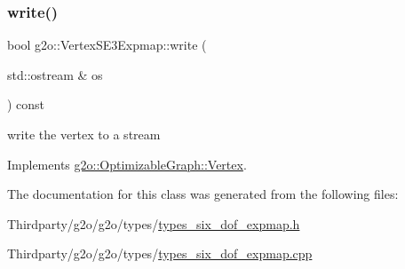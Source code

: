 \mbox{\label{classg2o_1_1_vertex_s_e3_expmap_ac1dfa6c71532f2e0bed236220bc1b604}} 
\subsubsection{\texorpdfstring{write()}{write()}}
{\footnotesize\ttfamily bool g2o\+::\+Vertex\+S\+E3\+Expmap\+::write (\begin{DoxyParamCaption}\item[{std\+::ostream \&}]{os }\end{DoxyParamCaption}) const\hspace{0.3cm}{\ttfamily [virtual]}}



write the vertex to a stream 



Implements \mbox{\hyperlink{classg2o_1_1_optimizable_graph_1_1_vertex_a4cac277db656fddb5f844d9009d601eb}{g2o\+::\+Optimizable\+Graph\+::\+Vertex}}.



The documentation for this class was generated from the following files\+:\begin{DoxyCompactItemize}
\item 
Thirdparty/g2o/g2o/types/\mbox{\hyperlink{types__six__dof__expmap_8h}{types\+\_\+six\+\_\+dof\+\_\+expmap.\+h}}\item 
Thirdparty/g2o/g2o/types/\mbox{\hyperlink{types__six__dof__expmap_8cpp}{types\+\_\+six\+\_\+dof\+\_\+expmap.\+cpp}}\end{DoxyCompactItemize}
